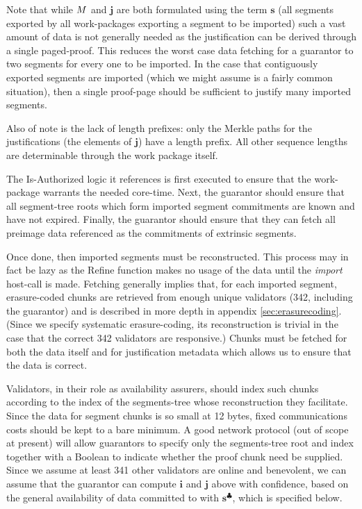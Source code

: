 Note that while $M$ and $\mathbf{j}$ are both formulated using the term $\mathbf{s}$ (all segments exported by all work-packages exporting a segment to be imported) such a vast amount of data is not generally needed as the justification can be derived through a single paged-proof. This reduces the worst case data fetching for a guarantor to two segments for every one to be imported. In the case that contiguously exported segments are imported (which we might assume is a fairly common situation), then a single proof-page should be sufficient to justify many imported segments.

Also of note is the lack of length prefixes: only the Merkle paths for the justifications (\ie the elements of $\mathbf{j}$) have a length prefix. All other sequence lengths are determinable through the work package itself.

The Is-Authorized logic it references is first executed to ensure that the work-package warrants the needed core-time. Next, the guarantor should ensure that all segment-tree roots which form imported segment commitments are known and have not expired. Finally, the guarantor should ensure that they can fetch all preimage data referenced as the commitments of extrinsic segments.

Once done, then imported segments must be reconstructed. This process may in fact be lazy as the Refine function makes no usage of the data until the \emph{import} host-call is made. Fetching generally implies that, for each imported segment, erasure-coded chunks are retrieved from enough unique validators (342, including the guarantor) and is described in more depth in appendix \ref{sec:erasurecoding}. (Since we specify systematic erasure-coding, its reconstruction is trivial in the case that the correct 342 validators are responsive.) Chunks must be fetched for both the data itself and for justification metadata which allows us to ensure that the data is correct.

Validators, in their role as availability assurers, should index such chunks according to the index of the segments-tree whose reconstruction they facilitate. Since the data for segment chunks is so small at 12 bytes, fixed communications costs should be kept to a bare minimum. A good network protocol (out of scope at present) will allow guarantors to specify only the segments-tree root and index together with a Boolean to indicate whether the proof chunk need be supplied. Since we assume at least 341 other validators are online and benevolent, we can assume that the guarantor can compute $\mathbf{i}$ and $\mathbf{j}$ above with confidence, based on the general availability of data committed to with $\mathbf{s}^\clubsuit$, which is specified below.

